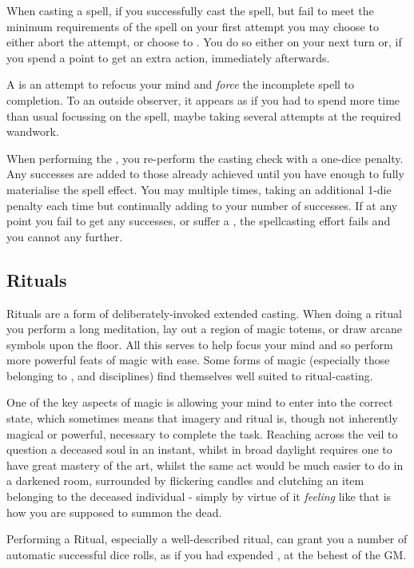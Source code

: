 When casting a spell, if you successfully cast the spell, but fail to meet the minimum requirements of the spell on your first attempt you may choose to either abort the attempt, or choose to . You do so either on your next turn or, if you spend a  point to get an extra action, immediately afterwards. 

A  is an attempt to refocus your mind and {\it force} the incomplete spell to completion. To an outside observer, it appears as if you had to spend more time than usual focussing on the spell, maybe taking several attempts at the required wandwork. 

When performing the , you re-perform the casting check with a one-dice penalty. Any successes are added to those already achieved until you have enough to fully materialise the spell effect. You may  multiple times, taking an additional 1-die penalty each time but continually adding to your number of successes. If at any point you fail to get any successes, or suffer a , the spellcasting effort fails and you cannot  any further.

\subsection{Rituals}

Rituals are a form of deliberately-invoked extended casting. When doing a ritual you perform a long meditation, lay out a region of magic totems, or draw arcane symbols upon the floor. All this serves to help focus your mind and so perform more powerful feats of magic with ease. Some forms of magic (especially those belonging to ,  and  disciplines) find themselves well suited to ritual-casting. 

One of the key aspects of magic is allowing your mind to enter into the correct state, which sometimes means that imagery and ritual is, though not inherently magical or powerful, necessary to complete the task. Reaching across the veil to question a deceased soul in an instant, whilst in broad daylight requires one to have great mastery of the art, whilst the same act would be much easier to do in a darkened room, surrounded by flickering candles and clutching an item belonging to the deceased individual - simply by virtue of it {\it feeling} like that is how you are supposed to summon the dead. 

Performing a Ritual, especially a well-described ritual, can grant you a number of automatic successful dice rolls, as if you had expended , at the behest of the GM.  


